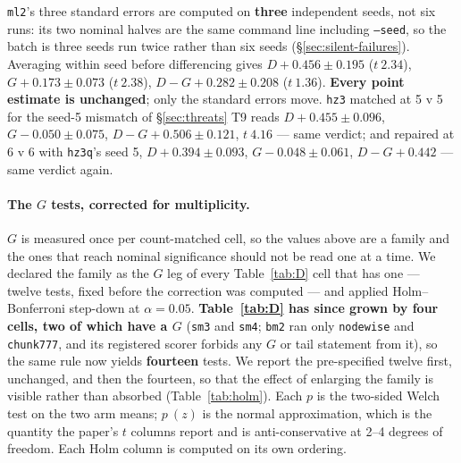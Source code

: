 \documentclass[10pt,letterpaper]{article}
\newcommand{\Dstat}{D}                         %
\newcommand{\Gstat}{G}                         %
\newcommand{\arm}[1]{\texttt{#1}}
\begin{document}
\arm{ml2}'s three standard errors are computed on \textbf{three} independent seeds, not six runs:
its two nominal halves are the same command line including \texttt{--seed}, so the batch is three
seeds run twice rather than six seeds (\S\ref{sec:silent-failures}). Averaging within seed before
differencing gives $\Dstat +0.456 \pm 0.195$ ($t\ 2.34$), $\Gstat +0.173 \pm 0.073$ ($t\ 2.38$),
$\Dstat - \Gstat +0.282 \pm 0.208$ ($t\ 1.36$). \textbf{Every point estimate is unchanged}; only
the standard errors move. \arm{hz3} matched at 5 v 5 for the seed-5 mismatch of
\S\ref{sec:threats} T9 reads $\Dstat +0.455 \pm 0.096$, $\Gstat -0.050 \pm 0.075$,
$\Dstat - \Gstat +0.506 \pm 0.121$, $t\ 4.16$ --- same verdict; and repaired at 6 v 6 with
\arm{hz3q}'s seed 5, $\Dstat +0.394 \pm 0.093$, $\Gstat -0.048 \pm 0.061$,
$\Dstat - \Gstat +0.442$ --- same verdict again.

\paragraph{The $\Gstat$ tests, corrected for multiplicity.}
$\Gstat$ is measured once per count-matched cell, so the values above are a family and the
ones that reach nominal significance should not be read one at a time. We declared the family as
the $\Gstat$ leg of every Table~\ref{tab:D} cell that has one --- twelve tests, fixed before the
correction was computed --- and applied Holm--Bonferroni step-down \citep{holm1979simple} at
$\alpha = 0.05$. \textbf{Table~\ref{tab:D} has since grown by four cells, two of which have a
$\Gstat$} (\arm{sm3} and \arm{sm4}; \arm{bm2} ran only \arm{nodewise} and \arm{chunk777}, and its
registered scorer forbids any $\Gstat$ or tail statement from it), so the same rule now yields
\textbf{fourteen} tests. We report the pre-specified twelve first, unchanged, and then the
fourteen, so that the effect of enlarging the family is visible rather than absorbed
(Table~\ref{tab:holm}). Each $p$ is the two-sided Welch test on the two arm means; $p\ (z)$ is the normal
approximation, which is the quantity the paper's $t$ columns report and is anti-conservative at
2--4 degrees of freedom. Each Holm column is computed on its own ordering.
\end{document}
